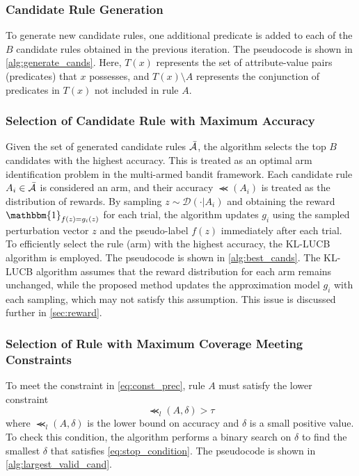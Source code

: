 \documentclass[runningheads]{llncs}
\begin{document}
\subsubsection{Candidate Rule Generation}
To generate new candidate rules, one additional predicate is added to each of the $B$ candidate rules obtained in the previous iteration. The pseudocode is shown in \cref{alg:generate_cands}. Here, $T(x)$ represents the set of attribute-value pairs (predicates) that $x$ possesses, and $T(x)\setminus A$ represents the conjunction of predicates in $T(x)$ not included in rule $A$.

\subsubsection{Selection of Candidate Rule with Maximum Accuracy}
Given the set of generated candidate rules $\bar{\mathcal{A}}$, the algorithm selects the top $B$ candidates with the highest accuracy. This is treated as an optimal arm identification problem in the multi-armed bandit framework. Each candidate rule $A_i\in\bar{\mathcal{A}}$ is considered an arm, and their accuracy $\Prec(A_i)$ is treated as the distribution of rewards. By sampling $z\sim\mathcal{D}(\cdot|A_i)$ and obtaining the reward $\mathbbm{1}_{f(z)=g_i(z)}$ for each trial, the algorithm updates $g_i$ using the sampled perturbation vector $z$ and the pseudo-label $f(z)$ immediately after each trial. To efficiently select the rule (arm) with the highest accuracy, the KL-LUCB algorithm \cite{kaufmann2013information} is employed. The pseudocode is shown in \cref{alg:best_cands}. The KL-LUCB algorithm assumes that the reward distribution for each arm remains unchanged, while the proposed method updates the approximation model $g_i$ with each sampling, which may not satisfy this assumption. This issue is discussed further in \cref{sec:reward}.

\subsubsection{Selection of Rule with Maximum Coverage Meeting Constraints}
To meet the constraint in \cref{eq:const_prec}, rule $A$ must satisfy the lower constraint
\begin{equation}
  \label{eq:stop_condition}
  \Prec_{l}(A,\delta)>\tau
\end{equation}
where $\Prec_{l}(A,\delta)$ is the lower bound on accuracy and $\delta$ is a small positive value. To check this condition, the algorithm performs a binary search on $\delta$ to find the smallest $\delta$ that satisfies \cref{eq:stop_condition}. The pseudocode is shown in \cref{alg:largest_valid_cand}.
\newline
\end{document}
